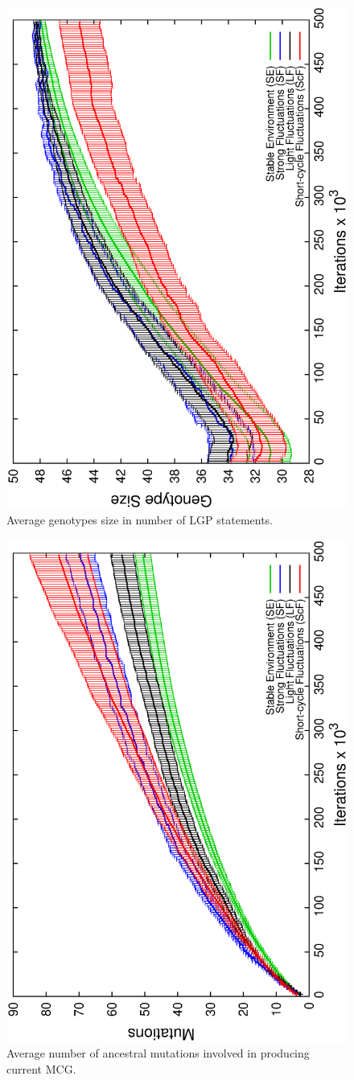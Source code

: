 \begin{figure}[h]
\centering
\includegraphics[width=0.7\columnwidth, angle=-90]{img/Size}
\caption{Average genotypes size in number of LGP statements.}
\label{fig:Size}
\end{figure}

\begin{figure}[h]
\centering
\includegraphics[width=0.7\columnwidth, angle=-90]{img/Mutations}
\caption{Average number of ancestral mutations involved in producing current MCG.}
\label{fig:Mutations}
\end{figure}

